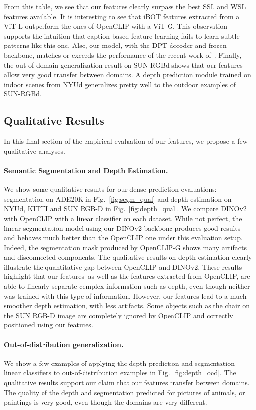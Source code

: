 From this table, we see that our features clearly surpass the best SSL and WSL features available. It is interesting to see that iBOT features extracted from a ViT-L outperform the ones of OpenCLIP with a ViT-G. This observation supports the intuition that caption-based feature learning fails to learn subtle patterns like this one. Also, our model, with the DPT decoder and frozen backbone, matches or exceeds the performance of the recent work of~\citet{li2022binsformer}.
Finally, the out-of-domain generalization result on SUN-RGBd shows that our features allow very good transfer between domains. A depth prediction module trained on indoor scenes from NYUd generalizes pretty well to the outdoor examples of SUN-RGBd.

\subsection{Qualitative Results} In this final section of the empirical evaluation of our features, we propose a few qualitative analyses.

\paragraph{Semantic Segmentation and Depth Estimation.} We show some qualitative results for our dense prediction evaluations: segmentation on ADE20K in Fig.~\ref{fig:segm_qual} and depth estimation on NYUd, KITTI and SUN RGB-D in Fig.~\ref{fig:depth_qual}.
We compare DINOv2 with OpenCLIP with a linear classifier on each dataset. While not perfect, the linear segmentation model using our DINOv2 backbone produces good results and behaves much better than the OpenCLIP one under this evaluation setup. Indeed, the segmentation mask produced by OpenCLIP-G shows many artifacts and disconnected components. The qualitative results on depth estimation clearly illustrate the quantitative gap between OpenCLIP and DINOv2. These results highlight that our features, as well as the features extracted from OpenCLIP, are able to linearly separate complex information such as depth, even though neither was trained with this type of information. However, our features lead to a much smoother depth estimation, with less artifacts. Some objects such as the chair on the SUN RGB-D image are completely ignored by OpenCLIP and correctly positioned using our features.

\paragraph{Out-of-distribution generalization.} We show a few examples of applying the depth prediction and segmentation linear classifiers to out-of-distribution examples in Fig.~\ref{fig:depth_ood}.
The qualitative results support our claim that our features transfer between domains. The quality of the depth and segmentation predicted for pictures of animals, or paintings is very good, even though the domains are very different.

